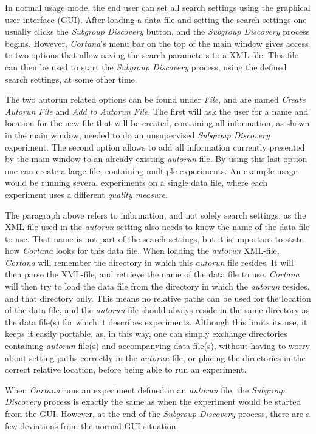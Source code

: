 \documentclass{article}
\begin{document}
In normal usage mode, the end user can set all search settings using the graphical user interface (GUI).
After loading a data file and setting the search settings one usually clicks the \emph{Subgroup Discovery} button, and the \emph{Subgroup Discovery} process begins.
However, \emph{Cortana}'s menu bar on the top of the main window gives access to two options that allow saving the search parameters to a XML-file.
This file can then be used to start the \emph{Subgroup Discovery} process, using the defined search settings, at some other time.

The two autorun related options can be found under \emph{File}, and are named \emph{Create Autorun File} and \emph{Add to Autorun File}.
The first will ask the user for a name and location for the new file that will be created, containing all information, as shown in the main window, needed to do an unsupervised \emph{Subgroup Discovery} experiment.
The second option allows to add all information currently presented by the main window to an already existing \emph{autorun} file.
By using this last option one can create a large file, containing multiple experiments.
An example usage would be running several experiments on a single data file, where each experiment uses a different \emph{quality measure}.

The paragraph above refers to information, and not solely search settings, as the XML-file used in the \emph{autorun} setting also needs to know the name of the data file to use.
That name is not part of the search settings, but it is important to state how \emph{Cortana} looks for this data file.
When loading the \emph{autorun} XML-file, \emph{Cortana} will remember the directory in which this \emph{autorun} file resides.
It will then parse the XML-file, and retrieve the name of the data file to use.
\emph{Cortana} will then try to load the data file from the directory in which the \emph{autorun} resides, and that directory only.
This means no relative paths can be used for the location of the data file, and the \emph{autorun} file should always reside in the same directory as the data file(s) for which it describes experiments.
Although this limits its use, it keeps it easily portable, as, in this way, one can simply exchange directories containing \emph{autorun} file(s) and accompanying data file(s), without having to worry about setting paths correctly in the \emph{autorun} file, or placing the directories in the correct relative location, before being able to run an experiment.

When \emph{Cortana} runs an experiment defined in an \emph{autorun} file, the \emph{Subgroup Discovery} process is exactly the same as when the experiment would be started from the GUI.
However, at the end of the \emph{Subgroup Discovery} process, there are a few deviations from the normal GUI situation.
\end{document}
